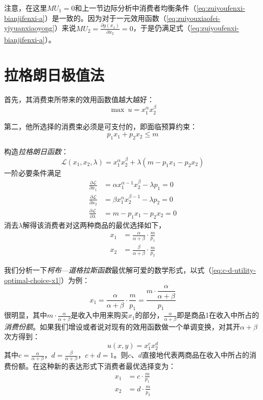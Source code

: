 注意，在这里$MU_1=0$和上一节边际分析中消费者均衡条件（\ref{eq:zuiyoufenxi-bianjifenxi-a}）是一致的。因为对于一元效用函数（\ref{eq:zuiyouxiaofei-yiyuanxiaoyong}）来说$MU_2=\frac{\partial g(x_1)}{\partial x_2}=0$，于是仍满足式（\ref{eq:zuiyoufenxi-bianjifenxi-a}）。



\section{拉格朗日极值法}

首先，其消费束所带来的效用函数值越大越好：
\begin{equation}
\max~u = x_1^{\alpha} x_2^{\beta}
\label{eq:zuiyouxiaofei-xiaoyonghanshu}
\end{equation}

第二，他所选择的消费束必须是可支付的，即面临预算约束：
\begin{equation}
p_1 x_1 + p_2 x_2 \le m
\label{eq:zuiyouxiaofei-yusuanyueshu}
\end{equation}

构造\emph{拉格朗日函数}：
\begin{equation}
\mathcal{L}(x_1,x_2,\lambda)=x_1^{\alpha} x_2^{\beta}+\lambda(m-p_1 x_1 - p_2 x_2)
\label{eq:zuiyouxiaofei-lagelangri}
\end{equation}
一阶必要条件满足
\begin{align}
\frac{\partial \mathcal{L}}{\partial x_1} &= \alpha x_1^{\alpha-1}x_2^{\beta} - \lambda p_1 = 0\\
\frac{\partial \mathcal{L}}{\partial x_2} &= \beta x_1^{\alpha} x_2^{\beta-1} - \lambda p_2 = 0\\
\frac{\partial \mathcal{L}}{\partial \lambda} &= m - p_1 x_1 - p_2 x_2 = 0
\end{align}
消去$\lambda$解得该消费者对这两种商品的最优选择如下，
\begin{align}
x_1 &= \frac{\alpha}{\alpha+\beta} \cdot \frac{m}{p_1} \label{eq:c-d-utility-optimal-choice-x1}\\
x_2 &= \frac{\beta}{\alpha+\beta} \cdot \frac{m}{p_2}
\end{align}

我们分析一下\emph{柯布—道格拉斯函数}最优解可爱的数学形式，以式（\ref{eq:c-d-utility-optimal-choice-x1}）为例：
\[
x_1 = \frac{\alpha}{\alpha+\beta} \cdot \frac{m}{p_1} = \dfrac{m \cdot \dfrac{\alpha}{\alpha+\beta}}{p_1}
\]
很明显，其中$m \cdot \frac{\alpha}{\alpha+\beta}$是收入中用来购买$x_1$的部分，$\frac{\alpha}{\alpha+\beta}$即是商品1在收入中所占的\emph{消费份额}。如果我们增设或者说对现有的效用函数做一个单调变换，对其开$\alpha+\beta$次方得到：
\begin{equation}
u(x,y) = x_1^{c} x_2^{d}
\label{eq:zuiyouxuanze-cd-utility-fenexingshi}
\end{equation}
其中$c=\frac{\alpha}{\alpha+\beta}$，$d=\frac{\beta}{\alpha+\beta}$，$c+d=1$。则$c$、$d$直接地代表两商品在收入中所占的消费份额。在这种新的表达形式下消费者最优选择变为：
\begin{align}
x_1 &= c \cdot \frac{m}{p_1}\\
x_2 &= d \cdot \frac{m}{p_2}
\end{align}

